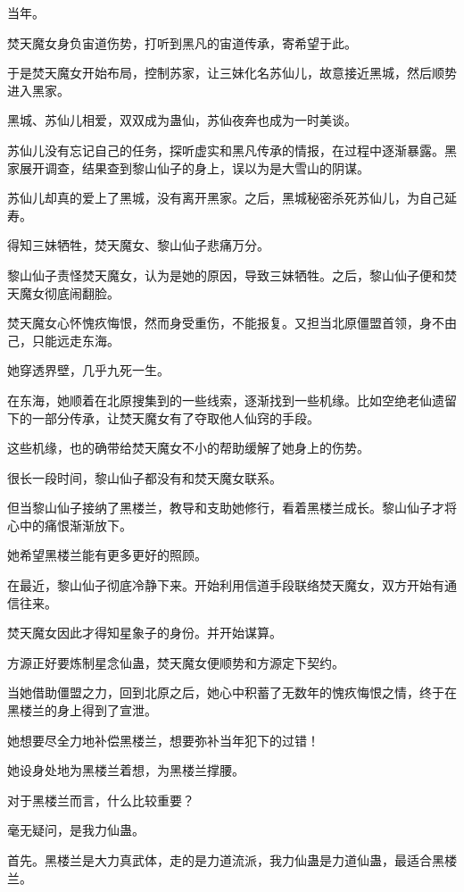 
\begin{this_body}

当年。

焚天魔女身负宙道伤势，打听到黑凡的宙道传承，寄希望于此。

于是焚天魔女开始布局，控制苏家，让三妹化名苏仙儿，故意接近黑城，然后顺势进入黑家。

黑城、苏仙儿相爱，双双成为蛊仙，苏仙夜奔也成为一时美谈。

苏仙儿没有忘记自己的任务，探听虚实和黑凡传承的情报，在过程中逐渐暴露。黑家展开调查，结果查到黎山仙子的身上，误以为是大雪山的阴谋。

苏仙儿却真的爱上了黑城，没有离开黑家。之后，黑城秘密杀死苏仙儿，为自己延寿。

得知三妹牺牲，焚天魔女、黎山仙子悲痛万分。

黎山仙子责怪焚天魔女，认为是她的原因，导致三妹牺牲。之后，黎山仙子便和焚天魔女彻底闹翻脸。

焚天魔女心怀愧疚悔恨，然而身受重伤，不能报复。又担当北原僵盟首领，身不由己，只能远走东海。

她穿透界壁，几乎九死一生。

在东海，她顺着在北原搜集到的一些线索，逐渐找到一些机缘。比如空绝老仙遗留下的一部分传承，让焚天魔女有了夺取他人仙窍的手段。

这些机缘，也的确带给焚天魔女不小的帮助缓解了她身上的伤势。

很长一段时间，黎山仙子都没有和焚天魔女联系。

但当黎山仙子接纳了黑楼兰，教导和支助她修行，看着黑楼兰成长。黎山仙子才将心中的痛恨渐渐放下。

她希望黑楼兰能有更多更好的照顾。

在最近，黎山仙子彻底冷静下来。开始利用信道手段联络焚天魔女，双方开始有通信往来。

焚天魔女因此才得知星象子的身份。并开始谋算。

方源正好要炼制星念仙蛊，焚天魔女便顺势和方源定下契约。

当她借助僵盟之力，回到北原之后，她心中积蓄了无数年的愧疚悔恨之情，终于在黑楼兰的身上得到了宣泄。

她想要尽全力地补偿黑楼兰，想要弥补当年犯下的过错！

她设身处地为黑楼兰着想，为黑楼兰撑腰。

对于黑楼兰而言，什么比较重要？

毫无疑问，是我力仙蛊。

首先。黑楼兰是大力真武体，走的是力道流派，我力仙蛊是力道仙蛊，最适合黑楼兰。


\end{this_body}
